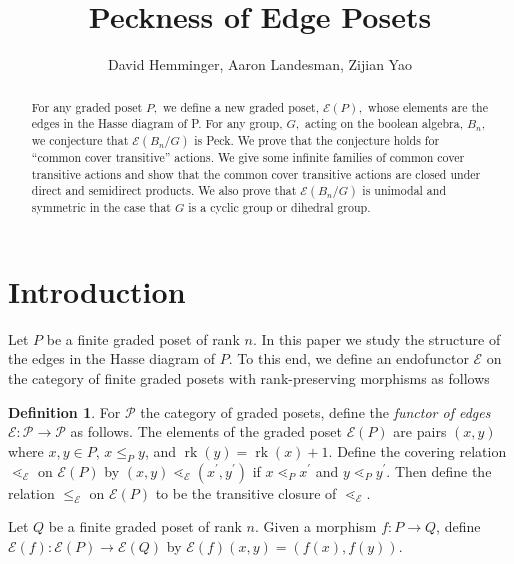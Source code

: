 \documentclass[10 pt]{amsart}
\title{Peckness of Edge Posets}
\author{David Hemminger, Aaron Landesman, Zijian Yao}
\theoremstyle{plain}
\theoremstyle{definition}
\newtheorem{defn}[thm]{Definition}
\theoremstyle{remark}
\numberwithin{equation}{section}
\newcommand\rk{\operatorname{rk}}
\begin{document}
\begin{abstract}
For any graded poset $P,$ we define a new graded poset, $\mathcal E(P),$ whose elements are the edges in the Hasse diagram of P. For any group, $G,$ acting on the boolean algebra, $B_n,$ we conjecture that $\mathcal E(B_n/G)$ is Peck. We prove that the conjecture holds for ``common cover transitive'' actions. We give some infinite families of common cover transitive actions and show that the common cover transitive actions are closed under direct and semidirect products. We also prove that $\mathcal E(B_n/G)$ is unimodal and symmetric in the case that $G$ is a cyclic group or dihedral group.
\end{abstract}

\maketitle

\section{Introduction}\label{sec:introduction}

Let $P$ be a finite graded poset of rank $n$.  In this paper we study the structure of the edges in the Hasse diagram of $P$.  To this end, we define an endofunctor $\mathcal{E}$ on the category of finite graded posets with rank-preserving morphisms as follows

\begin{defn}
\label{defn:functor_of_edges}
For $\mathcal P$ the category of graded posets, define the {\it functor of edges} $\mathcal{E}\colon\mathcal{P} \rightarrow \mathcal{P}$ as follows. The elements of the graded poset $\mathcal{E}(P)$ are pairs $(x, y)$ where $x,y\in P$, $x\le_P y$, and $\rk(y) = \rk(x) + 1$. Define the covering relation $\lessdot_{\mathcal{E}}$ on $\mathcal{E}(P)$ by $(x, y) \lessdot_{\mathcal{E}} (x^\prime, y^\prime)$ if $x\lessdot_P x^\prime$ and $y\lessdot_P y^\prime$. Then define the relation $\le_{\mathcal{E}}$ on $\mathcal{E}(P)$ to be the transitive closure of $\lessdot_{\mathcal{E}}$.

Let $Q$ be a finite graded poset of rank $n$. Given a morphism $f\colon P\rightarrow Q$, define $\mathcal{E}(f)\colon \mathcal{E}(P)\rightarrow \mathcal{E}(Q)$ by $\mathcal{E}(f)(x,y) = (f(x), f(y))$.
\end{defn}
\end{document}
